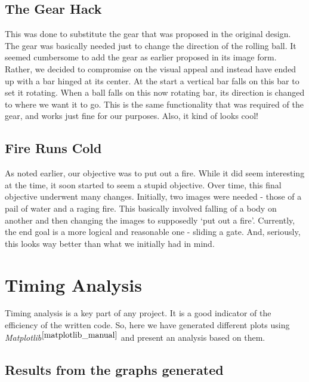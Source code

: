 \documentclass[a4paper,11pt]{article}
\begin{document}
\subsection{The Gear Hack}

This was done to substitute the gear that was proposed in the original design. The gear was basically needed just to change the direction of the rolling ball. It seemed cumbersome to add the gear as earlier proposed in its image form. Rather, we decided to compromise on the visual appeal and instead have ended up with a bar hinged at its center. At the start a vertical bar falls on this bar to set it rotating.  When a ball falls on this now rotating bar, its direction is changed to where we want it to go. This is the same functionality that was required of the gear, and works just fine for our purposes. Also, it kind of looks cool!

\subsection{Fire Runs Cold}

As noted earlier, our objective was to put out a fire. While it did seem interesting at the time, it soon started to seem a stupid objective. Over time, this final objective underwent many changes. Initially, two images were needed - those of a pail of water and a raging fire. This basically involved falling of a body on another and then changing the images to supposedly `put out a fire'. Currently, the end goal is a more logical and reasonable one - sliding a gate. And, seriously, this looks way better than what we initially had in mind.

\section{Timing Analysis}

Timing analysis is a key part of any project. It is a good indicator of the efficiency of the written code. So, here we have generated 
different plots using \emph{Matplotlib}$^{\cite{matplotlib_manual}}$ and present an analysis based on them.

\subsection{Results from the graphs generated}
\end{document}
